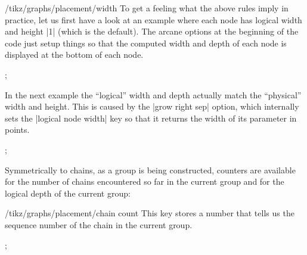 \begin{key}{/tikz/graphs/placement/width}
    To get a feeling what the above rules imply in practice, let us first have
    a look at an example where each node has logical width and height |1|
    (which is the default). The arcane options at the beginning of the code
    just setup things so that the computed width and depth of each node is
    displayed at the bottom of each node.
\begin{codeexample}[preamble={\usetikzlibrary{graphs}}]
\tikz
  ;
\end{codeexample}
    In the next example the ``logical'' width and depth actually match the
    ``physical'' width and height. This is caused by the |grow right sep|
    option, which internally sets the |logical node width| key so that it
    returns the width of its parameter in points.
\begin{codeexample}[preamble={\usetikzlibrary{graphs}}]
\tikz
  ;
\end{codeexample}
\end{key}

Symmetrically to chains, as a group is being constructed, counters are
available for the number of chains encountered so far in the current group and
for the logical depth of the current group:
%
\begin{key}{/tikz/graphs/placement/chain count}
    This key stores a number that tells us the sequence number of the
    chain in the current group.
\begin{codeexample}[preamble={\usetikzlibrary{graphs}}]
\tikz {};
\end{codeexample}
\end{key}

